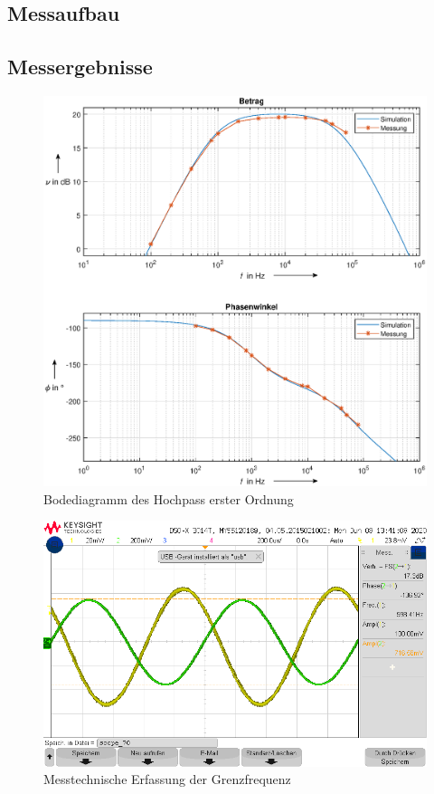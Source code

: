 \subsection{Messaufbau}

\subsection{Messergebnisse}
\begin{figure}[H]
    \centering
    \includegraphics[width=\costumPicWidth]{Lab_2/Plots/HP_first_order.eps}
    \caption{Bodediagramm des Hochpass erster Ordnung}
    \label{fig:Bode_HP_first_order}
\end{figure}

\begin{figure}[H]
    \centering
    \includegraphics[width=\costumPicWidth]{Lab_2/Messungen/HP_first_order/scope_70.png}
    \caption{Messtechnische Erfassung der Grenzfrequenz}
    \label{fig:HP_FO_fg}
\end{figure}
